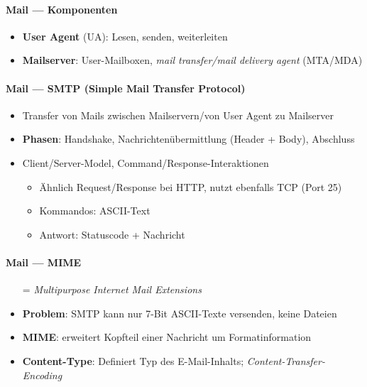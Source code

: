 \paragraph{Mail --- Komponenten}
\begin{itemize}
  \item \textbf{User Agent} (UA): Lesen, senden, weiterleiten
  \item \textbf{Mailserver}: User-Mailboxen, \emph{mail transfer/mail delivery agent} (MTA/MDA)
\end{itemize}

\paragraph{Mail --- SMTP (Simple Mail Transfer Protocol)}
\begin{itemize}
	\item Transfer von Mails zwischen Mailservern/von User Agent zu Mailserver
  \item \textbf{Phasen}: Handshake, Nachrichtenübermittlung (Header + Body), Abschluss
  \item Client/Server-Model, Command/Response-Interaktionen
  \begin{itemize}
    \item Ähnlich Request/Response bei HTTP, nutzt ebenfalls TCP (Port 25)
    \item Kommandos: ASCII-Text
    \item Antwort: Statuscode + Nachricht
  \end{itemize}
\end{itemize}

\paragraph{Mail --- MIME}
\begin{itemize}
  \item[=] \emph{Multipurpose Internet Mail Extensions}
  \item \textbf{Problem}: SMTP kann nur 7-Bit ASCII-Texte versenden, keine Dateien
  \item \textbf{MIME}: erweitert Kopfteil einer Nachricht um Formatinformation
  \item \textbf{Content-Type}: Definiert Typ des E-Mail-Inhalts; \emph{Content-Transfer-Encoding}
\end{itemize}

